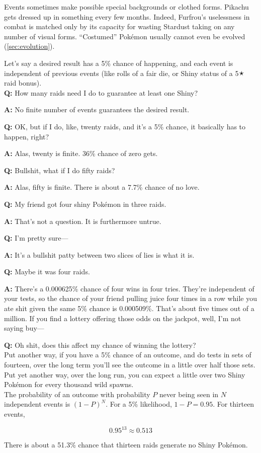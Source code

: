 Events sometimes make possible special backgrounds or clothed forms.
Pikachu gets dressed up in something every few months.
Indeed, Furfrou's uselessness in combat is matched only by its
  capacity for wasting Stardust taking on any number of visual forms.
``Costumed'' Pokémon usually cannot even be evolved (\autoref{sec:evolution}).
\begin{tcolorbox}[enhanced,title=An aside regarding independent events,halign title=flush center]
Let's say a desired result has a 5\% chance of happening, and each event is independent of previous events (like rolls of a fair die, or Shiny status of a 5🟉 raid bonus).\\

\textbf{Q:} How many raids need I do to guarantee at least one Shiny?

\textbf{A:} No finite number of events guarantees the desired result.

\textbf{Q:} OK, but if I do, like, twenty raids, and it's a 5\% chance, it basically has to happen, right?

\textbf{A:} Alas, twenty is finite. 36\% chance of zero gets.

\textbf{Q:} Bullshit, what if I do fifty raids?

\textbf{A:} Alas, fifty is finite. There is about a 7.7\% chance of no love.

\textbf{Q:} My friend got four shiny Pokémon in three raids.

\textbf{A:} That's not a question. It is furthermore untrue.

\textbf{Q:} I'm pretty sure---

\textbf{A:} It's a bullshit patty between two slices of lies is what it is.

\textbf{Q:} Maybe it was four raids.

\textbf{A:} There's a 0.000625\% chance of four wins in four tries. They're independent of your tests,
             so the chance of your friend pulling juice four times in a row while you ate shit given
             the same 5\% chance is 0.000509\%. That's about five times out of a million.
             If you find a lottery offering those odds on the jackpot, well, I'm not saying buy---

\textbf{Q:} Oh shit, does this affect my chance of winning the lottery?\\

Put another way, if you have a 5\% chance of an outcome, and do tests in sets of fourteen,
 over the long term you'll see the outcome in a little over half those sets.
Put yet another way, over the long run, you can expect a little over two Shiny
 Pokémon for every thousand wild spawns.\\

The probability of an outcome with probability $P$ never being seen in $N$ independent
  events is ${(1 - P)}^N$. For a 5\% likelihood, $1 - P = 0.95$. For thirteen events,

  \[ 0.95^{13} ≈ 0.513 \]

There is about a 51.3\% chance that thirteen raids generate no Shiny Pokémon.
\end{tcolorbox}
